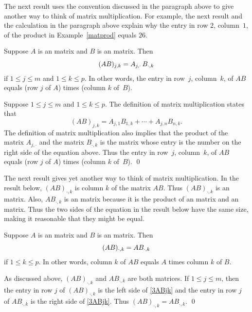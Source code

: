 The next result uses the convention discussed in the paragraph above to give another way to think of matrix multiplication. For example, the next result and the calculation in the paragraph above explain why the entry in row $2$, column~$1$, of the product in Example~\ref{matprod} equals $26$.

{Suppose $A$ is an  matrix and $B$ is an
 matrix. Then
\vspace{-.06in} %
\[
(AB)_{j,k} = A_{j,\cdot} \, B_{\cdot, k}
\vspace{-.06in} %
\]
if $1 \le j \le m$ and $1 \le k \le p$. In other words, the entry in row~$j$, column~$k$, of $AB$ equals (row $j$ of $A$) times (column $k$ of~$B$).}

\proof
Suppose $1 \le j \le m$ and $1 \le k \le p$. The definition of matrix multiplication states that
\begin{equation} \label{3ABjk}
(AB)_{j,k} = A_{j,1} B_{1,k} + \cdots + A_{j,n} B_{n,k}.
\end{equation}%
The definition of matrix multiplication also implies that the product of the  matrix $A_{j, \cdot}$ and the  matrix
$B_{\cdot, k}$ is the  matrix whose entry is the number on the right side of the equation above. Thus the entry in row~$j$, column~$k$, of $AB$ equals (row $j$ of $A$) times (column $k$ of~$B$).
\qed

The next result gives yet another way to think of matrix multiplication. In the result below, $(AB)_{\cdot,k}$ is column $k$ of the  matrix $AB$. Thus $(AB)_{\cdot,k}$ is an  matrix. Also, $A B_{\cdot, k}$ is an  matrix because it is the product of an  matrix and an  matrix. Thus the two sides of the equation in the result below have the same size, making it reasonable that they might be equal.

{Suppose $A$ is an  matrix and $B$ is an  matrix. Then
\vspace{-.06in} %
\[
(AB)_{\cdot,k} = A B_{\cdot, k}
\vspace{-.06in} %
\]
if $1 \le k \le p$. In other words, column $k$ of $AB$ equals $A$ times column $k$ of $B$.}

\proof
As discussed above, $(AB)_{\cdot,k}$ and $A B_{\cdot, k}$ are both  matrices. If $1 \le j \le m$, then the entry in row $j$ of $(AB)_{\cdot,k}$ is the left side of \ref{3ABjk} and the entry in row $j$ of $A B_{\cdot, k}$ is the right side of \ref{3ABjk}. Thus $(AB)_{\cdot,k} = A B_{\cdot, k}$.
\qed

